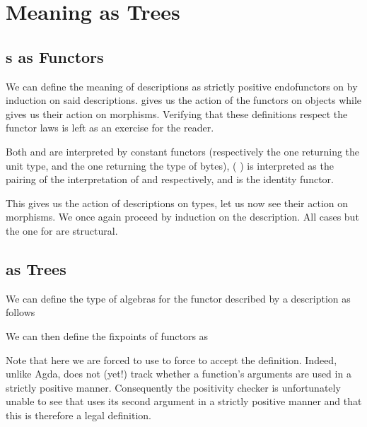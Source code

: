 \section{Meaning as Trees}\label{sec:trees}

\subsection{s as Functors}

We can define the meaning of descriptions as strictly positive
endofunctors on  by induction on said descriptions.
%
 gives us the action of the functors on objects
while  gives us their action on morphisms.
%
Verifying that these definitions respect the functor laws is left as
an exercise for the reader.

Both  and  are interpreted by constant
functors (respectively the one returning the unit type, and the one returning
the type of bytes),
%
(  ) is interpreted as the
pairing of the interpretation of  and  respectively,
%
and  is the identity functor.


This gives us the action of descriptions on types, let us now
see their action on morphisms.
%
We once again proceed by induction on the description.
%
All cases but the one for  are structural.


\subsection{ as Trees}

We can define the type of algebras for the functor described by a
 description as follows


We can then define the fixpoints of functors as



%
Note that here we are forced to use \assertTotal{} to force \idris{}
to accept the definition.
%
Indeed, unlike Agda, \idris{} does not (yet!) track whether a function's
arguments are used in a strictly positive manner.
%
Consequently the positivity checker
is unfortunately unable to see that  uses its second
argument in a strictly positive manner
and that this is therefore a legal definition.

